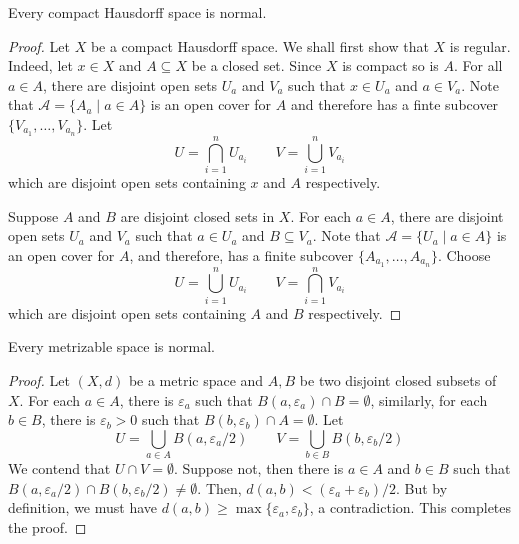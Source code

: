 \begin{theorem}
    Every compact Hausdorff space is normal.
\end{theorem}
\begin{proof}
    Let $X$ be a compact Hausdorff space. We shall first show that $X$ is regular. Indeed, let $x\in X$ and $A\subseteq X$ be a closed set. Since $X$ is compact so is $A$. For all $a\in A$, there are disjoint open sets $U_a$ and $V_a$ such that $x\in U_a$ and $a\in V_a$. Note that $\mathscr{A} = \{A_a\mid a\in A\}$ is an open cover for $A$ and therefore has a finte subcover $\{V_{a_1},\ldots,V_{a_n}\}$. Let 
    \begin{equation*}
        U = \bigcap_{i = 1}^nU_{a_i}\qquad V = \bigcup_{i = 1}^nV_{a_i}
    \end{equation*}
    which are disjoint open sets containing $x$ and $A$ respectively.

    Suppose $A$ and $B$ are disjoint closed sets in $X$. For each $a\in A$, there are disjoint open sets $U_a$ and $V_a$ such that $a\in U_a$ and $B\subseteq V_a$. Note that $\mathscr{A} = \{U_a\mid a\in A\}$ is an open cover for $A$, and therefore, has a finite subcover $\{A_{a_1},\ldots,A_{a_n}\}$. Choose 
    \begin{equation*}
        U = \bigcup_{i = 1}^n U_{a_i}\qquad V = \bigcap_{i = 1}^nV_{a_i}
    \end{equation*}
    which are disjoint open sets containing $A$ and $B$ respectively.
\end{proof}

\begin{theorem}
    Every metrizable space is normal.
\end{theorem}
\begin{proof}
    Let $(X,d)$ be a metric space and $A,B$ be two disjoint closed subsets of $X$. For each $a\in A$, there is $\varepsilon_a$ such that $B(a,\varepsilon_a)\cap B = \emptyset$, similarly, for each $b\in B$, there is $\varepsilon_b > 0$ such that $B(b,\varepsilon_b)\cap A = \emptyset$. Let 
    \begin{equation*}
        U = \bigcup_{a\in A}B(a,\varepsilon_a/2)\qquad V = \bigcup_{b\in B}B(b,\varepsilon_b/2)
    \end{equation*}
    We contend that $U\cap V = \emptyset$. Suppose not, then there is $a\in A$ and $b\in B$ such that $B(a,\varepsilon_a/2)\cap B(b,\varepsilon_b/2)\ne\emptyset$. Then, $d(a,b) < (\varepsilon_a + \varepsilon_b)/2$. But by definition, we must have $d(a,b)\ge\max\{\varepsilon_a,\varepsilon_b\}$, a contradiction. This completes the proof.
\end{proof}

